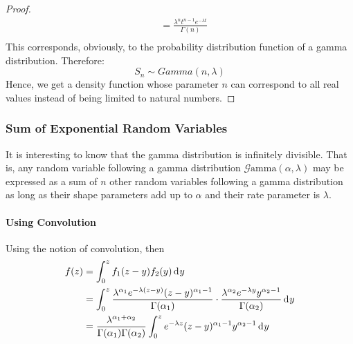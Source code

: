 \documentclass[12pt]{article}
\newcommand{\G}{\mathcal{G}}
\begin{document}
\begin{proof}
\begin{equation}
\begin{split}
						&=	\frac{\lambda^n t^{n-1} e^{-\lambda t}}{\Gamma(n)}\\
		\end{split}
	\end{equation}
	This corresponds, obviously, to the probability distribution function of a gamma distribution. Therefore:
	\begin{equation}
		S_n \sim Gamma(n, \lambda)
	\end{equation}
	Hence, we get a density function whose parameter $n$ can correspond to all real values instead of being limited to
	natural numbers.
\end{proof}


\pagebreak
\subsubsection{Sum of Exponential Random Variables}
It is interesting to know that the gamma distribution is infinitely divisible. That is, any random variable following a
gamma distribution $\G\text{amma}(\alpha, \lambda)$ may be expressed as a sum of $n$ other random variables following a
gamma distribution as long as their shape parameters add up to $\alpha$ and their rate parameter is $\lambda$.
\paragraph{Using Convolution}
Using the notion of convolution, then
\begin{equation}
	\begin{split}
		f(z)	&=	\int_{0}^{z} f_1 (z-y) f_2 (y) \mathop{}\!\mathrm{d^{}}y\\
				&=	\int_{0}^{z}\frac{\lambda^{\alpha_1} e^{-\lambda(z-y)} (z-y)^{\alpha_1 -1}}{\Gamma(\alpha_1)} \cdot \frac{\lambda^{\alpha_2} e^{-\lambda y}y^{\alpha_2 -1}}{\Gamma(\alpha_2)}\mathop{}\!\mathrm{d^{}}y\\
				&=	\frac{\lambda^{\alpha_1+\alpha_2}}{\Gamma(\alpha_1) \Gamma(\alpha_2)}\int_{0}^{z}e^{-\lambda z}(z-y)^{\alpha_1 -1}y^{\alpha_2 -1}\mathop{}\!\mathrm{d^{}}y\\
	\end{split}
\end{equation}
\end{document}
